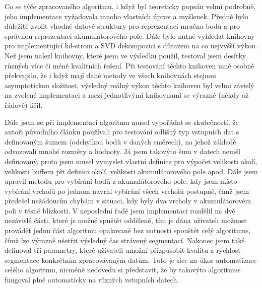 \documentclass[11pt,twoside,a4paper]{book}
\begin{document}
Co se týče zpracovaného algoritmu, i když byl teoreticky popsán velmi podrobně, jeho implementace vyžadovala mnoho vlastních úprav a myšlenek. Předně bylo důležité zvolit vhodné datové struktury pro reprezentaci mračna bodů a pro správnou reprezentaci akumulátorového pole. Dále bylo nutné vyhledat knihovny pro implementující kd-strom a SVD dekompozici s důrazem na co nejvyšší výkon. Než jsem nalezl knihovny, které jsem ve výsledku použil, testoval jsem desítky různých více či méně kvalitních řešení. Při testování těchto knihoven mně osobně překvapilo, že i když mají dané metody ve všech knihovnách stejnou asymptotickou složitost, výsledný reálný výkon těchto knihoven byl velmi závislý na zvolené implementaci a mezi jednotlivými knihovnami se výrazně (někdy až řádově) lišil.

Dále jsem se při implementaci algoritmu musel vypořádat se skutečností, že autoři původního článku používali pro testování odlišný typ vstupních dat s definovaným šumem (odchylkou bodů v daných směrech), na jehož základě odvozovali mnohé rozměry a hodnoty. Já jsem takovýto šum v datech neměl definovaný, proto jsem musel vymyslet vlastní definice pro výpočet velikosti okolí, velikosti bufferu při definici okolí, velikosti akumulátorového pole apod. Dále jsem upravil metodu pro vybírání bodů z akumulátorového pole, kdy jsem místo vybírání vrcholů po jednom navrhl vybírání všech vrcholů postupně, čímž jsem předešel nežádoucím chybám v situaci, kdy byly dva vrcholy v akumulátorovém poli v těsné blízkosti. V neposlední řadě jsem implementaci rozdělil na dvě nezávislé části, které je možné spuštět odděleně, tím je dána uživateli možnost provádět jednu část algoritmu opakovaně bez nutnosti spouštět celý algoritmus, čímž lze výrazně ušetřit výsledný čas strávený segmentací. Nakonec jsem také definoval tři parametry, které uživateli umožní přizpůsobit kvalitu a rychlost segmentace konkrétním zpracovávaným datům. Toto je sice na úkor automatizace celého algoritmu, nicméně nedovedu si představit, že by takovýto algoritmus fungoval plně automaticky na různých vstupních datech.
\end{document}
